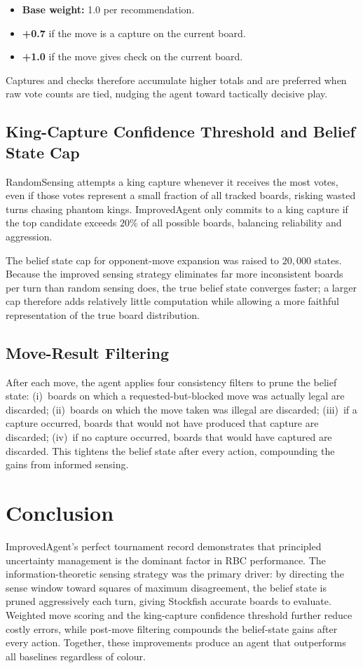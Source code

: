 \documentclass{article}
\begin{document}
\begin{itemize}
  \item \textbf{Base weight:} 1.0 per recommendation.
  \item \textbf{+0.7} if the move is a capture on the current board.
  \item \textbf{+1.0} if the move gives check on the current board.
\end{itemize}

Captures and checks therefore accumulate higher totals and are preferred when raw vote
counts are tied, nudging the agent toward tactically decisive play.

\subsection{King-Capture Confidence Threshold and Belief State Cap}

RandomSensing attempts a king capture whenever it receives the most votes, even if
those votes represent a small fraction of all tracked boards, risking wasted turns
chasing phantom kings. ImprovedAgent only commits to a king capture if the top
candidate exceeds $20\%$ of all possible boards, balancing reliability and
aggression.

The belief state cap for opponent-move expansion was raised to $20{,}000$ states.
Because the improved sensing strategy eliminates far more inconsistent boards per
turn than random sensing does, the true belief state converges faster; a larger cap
therefore adds relatively little computation while allowing a more faithful
representation of the true board distribution.

\subsection{Move-Result Filtering}

After each move, the agent applies four consistency filters to prune the belief state:
(i)~boards on which a requested-but-blocked move was actually legal are discarded;
(ii)~boards on which the move taken was illegal are discarded;
(iii)~if a capture occurred, boards that would not have produced that capture are
discarded; (iv)~if no capture occurred, boards that would have captured are discarded.
This tightens the belief state after every action, compounding the gains from
informed sensing.

\section{Conclusion}

ImprovedAgent's perfect tournament record demonstrates that principled uncertainty
management is the dominant factor in RBC performance. The information-theoretic
sensing strategy was the primary driver: by directing the sense window toward squares
of maximum disagreement, the belief state is pruned aggressively each turn, giving
Stockfish accurate boards to evaluate. Weighted move scoring and the king-capture
confidence threshold further reduce costly errors, while post-move filtering compounds
the belief-state gains after every action. Together, these improvements produce an
agent that outperforms all baselines regardless of colour.
\end{document}
